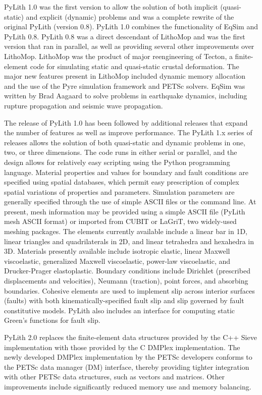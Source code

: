 PyLith 1.0 was the first version to allow the solution of both
implicit (quasi-static) and explicit (dynamic) problems and was a
complete rewrite of the original PyLith (version 0.8). PyLith 1.0
combines the functionality of EqSim
\cite{Aagaard:etal:2001a,Aagaard:etal:2001b} and PyLith 0.8. PyLith
0.8 was a direct descendant of LithoMop and was the first version that
ran in parallel, as well as providing several other improvements over
LithoMop. LithoMop was the product of major reengineering of Tecton, a
finite-element code for simulating static and quasi-static crustal
deformation. The major new features present in LithoMop included
dynamic memory allocation and the use of the Pyre simulation framework
and PETSc solvers. EqSim was written by Brad Aagaard to solve problems
in earthquake dynamics, including rupture propagation and seismic wave
propagation.

The release of PyLith 1.0 has been followed by additional releases
that expand the number of features as well as improve performance.
The PyLith 1.x series of releases allows the solution of both
quasi-static and dynamic problems in one, two, or three
dimensions. The code runs in either serial or parallel, and the design
allows for relatively easy scripting using the Python programming
language. Material properties and values for boundary and fault
conditions are specified using spatial databases, which permit easy
prescription of complex spatial variations of properties and
parameters. Simulation parameters are generally specified through the
use of simple ASCII files or the command line.  At present, mesh
information may be provided using a simple ASCII file (PyLith mesh
ASCII format) or imported from CUBIT or LaGriT, two widely-used
meshing packages. The elements currently available include a linear
bar in 1D, linear triangles and quadrilaterals in 2D, and linear
tetrahedra and hexahedra in 3D. Materials presently available include
isotropic elastic, linear Maxwell viscoelastic, generalized Maxwell
viscoelastic, power-law viscoelastic, and Drucker-Prager
elastoplastic. Boundary conditions include Dirichlet (prescribed
displacements and velocities), Neumann (traction), point forces, and
absorbing boundaries.  Cohesive elements are used to implement slip
across interior surfaces (faults) with both kinematically-specified
fault slip and slip governed by fault constitutive models. PyLith also
includes an interface for computing static Green's functions for fault
slip.

PyLith 2.0 replaces the finite-element data structures provided by the
C++ Sieve implementation with those provided by the C DMPlex
implementation.  The newly developed DMPlex implementation by the
PETSc developers conforms to the PETSc data manager (DM) interface,
thereby providing tighter integration with other PETSc data
structures, such as vectors and matrices. Other improvements include
significantly reduced memory use and memory balancing.

